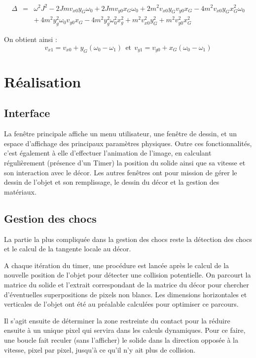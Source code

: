 \begin{eqnarray*}
	\Delta & = & \omega^2 J^2 -2Jmv_{x0}y_G\omega_0 + 2Jmv_{y0}x_G \omega_0  + 2m^2v_{x0}y_Gv_{y0}x_G - 4m^2v_{x0}y_Gx^2_G\omega_0 \\
		& & +\ 4m^2y^2_g\omega_0 v_{y0} x_G- 4m^2y^2_g\omega^2_0x^2_g + m^2v^2_{x0}y^2_G + m^2v^2_{y0}x^2_G
\end{eqnarray*}

On obtient ainsi :
\begin{equation}
v_{x1}=v_{x0} +y_G(\omega_0 - \omega_1) \: \ \text{et} \ \:  v_{y1}=v_{y0} +x_G(\omega_0 - \omega_1)
\end{equation} 

\newpage

\section{Réalisation}
\subsection{Interface}
La fenêtre principale affiche un menu utilisateur, une fenêtre de dessin,
et un espace d'affichage des principaux paramètres physiques.
Outre ces fonctionnalités, c'est également à elle d'effectuer l'animation
de l'image, en calculant régulièrement (présence d'un Timer) la position
du solide ainsi que sa vitesse et son interaction avec le décor.
Les autres fenêtres ont pour mission de gérer le dessin de l'objet et son remplissage,
le dessin du décor et la gestion des matériaux.


\subsection{Gestion des chocs}
La partie la plus compliquée dans la gestion des chocs reste la détection des chocs
et le calcul de la tangente locale au décor.

A chaque itération du timer, une procédure est lancée après le calcul de 
la nouvelle position de l'objet pour détecter une collision potentielle.
On parcourt la matrice du solide et l'extrait correspondant de la matrice
du décor pour chercher d'éventuelles superpositions de pixels non blancs.
Les dimensions horizontales et verticales de l'objet ont été au préalable
calculées pour optimiser ce parcours.

Il s'agit ensuite de déterminer la zone restreinte du contact pour la réduire ensuite
à un unique pixel qui servira dans les calculs dynamiques.
Pour ce faire, une boucle fait reculer (sans l'afficher) le solide dans 
la direction opposée à la vitesse, pixel par pixel,
jusqu'à ce qu'il n'y ait plus de collision.

